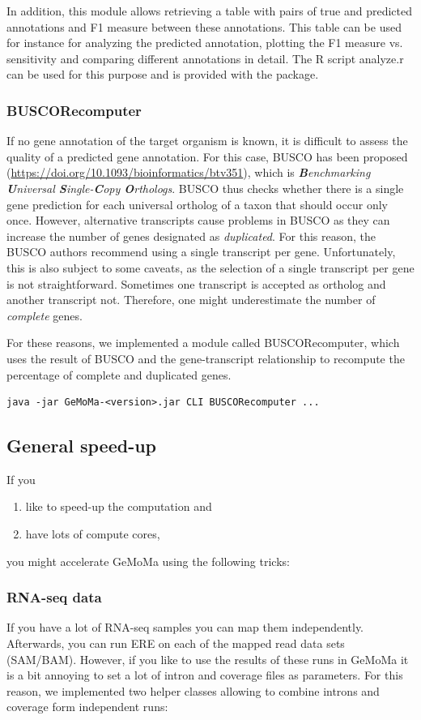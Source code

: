 \documentclass{article}
\begin{document}
In addition, this module allows retrieving a table with pairs of true and predicted annotations and F1 measure between these annotations. This table can be used for instance for analyzing the predicted annotation, plotting the F1 measure vs. sensitivity and comparing different annotations in detail. The R script analyze.r can be used for this purpose and is provided with the package.

\subsubsection{BUSCORecomputer}
If no gene annotation of the target organism is known, it is difficult to assess the quality of a predicted gene annotation. For this case, BUSCO has been proposed (\url{https://doi.org/10.1093/bioinformatics/btv351}), which is \textit{\textbf{B}enchmarking \textbf{U}niversal \textbf{S}ingle-\textbf{C}opy \textbf{O}rthologs}. BUSCO thus checks whether there is a single gene prediction for each universal ortholog of a taxon that should occur only once. However, alternative transcripts cause problems in BUSCO as they can increase the number of genes designated as \textit{duplicated}. For this reason, the BUSCO authors recommend using a single transcript per gene. Unfortunately, this is also subject to some caveats, as the selection of a single transcript per gene is not straightforward. Sometimes one transcript is accepted as ortholog and another transcript not. Therefore, one might underestimate the number of \textit{complete} genes.

For these reasons, we implemented a module called BUSCORecomputer, which uses the result of BUSCO and the gene-transcript relationship to recompute the percentage of complete and duplicated genes.
\begin{verbatim}
java -jar GeMoMa-<version>.jar CLI BUSCORecomputer ...
\end{verbatim}

\subsection{General speed-up}
If you
\begin{enumerate}
\item like to speed-up the computation and
\item have lots of compute cores,
\end{enumerate}
you might accelerate GeMoMa using the following tricks:

\subsubsection{RNA-seq data}
If you have a lot of RNA-seq samples you can map them independently. Afterwards, you can run ERE on each of the mapped read data sets (SAM/BAM). However, if you like to use the results of these runs in GeMoMa it is a bit annoying to set a lot of intron and coverage files as parameters. For this reason, we implemented two helper classes allowing to combine introns and coverage form independent runs:
\end{document}
